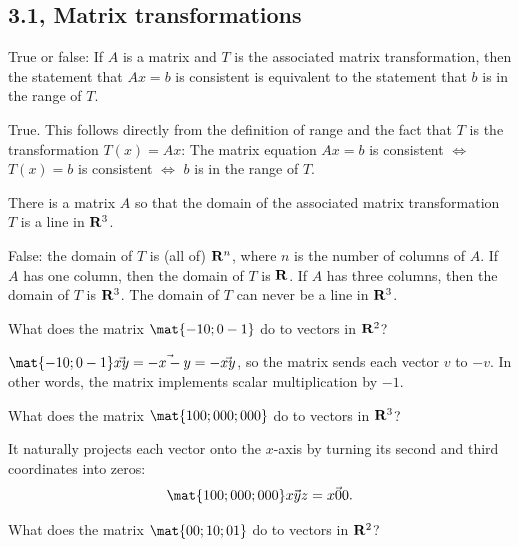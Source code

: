 
\subsection{3.1, Matrix transformations}

\begin{problems}
%
\problem %
True or false: If $A$ is a matrix and $T$ is the associated matrix 
transformation, then the statement that $Ax = b$ is consistent is 
equivalent to the statement that $b$ is in the range of $T$.

\begin{solution}
  True. This follows directly from the definition of range and the fact that $T$
  is the transformation $T(x) = Ax$: \newline %
  The matrix equation $Ax = b$ is consistent $\iff$ $T(x) = b$ is consistent
    $\iff$ $b$ is in the range of $T$.
\end{solution}

\problem %
There is a matrix $A$ so that the domain of the associated matrix transformation
$T$ is a line in ${\bf R}^3$.

\begin{solution}
  False: the domain of $T$ is (all of) ${\bf R}^n$, where $n$ is the number of
  columns of $A$.  If $A$ has one column, then the domain of $T$ is ${\bf
    R}$. If $A$ has three columns, then the domain of $T$ is ${\bf R}^3$.  The
  domain of $T$ can never be a line in ${\bf R}^3$.
\end{solution}


\problem %
What does the matrix $\mat{-1 0; 0 -1}$ do to vectors in ${\bf R}^2$?

\begin{solution}
  $\mat{-1 0; 0 -1}\vec{x y} = \vec{-x -y} = - \vec{x y}$, so the matrix sends
  each vector $v$ to $-v$.  In other words, the matrix implements scalar
  multiplication by $-1$.
\end{solution}



\problem %
What does the matrix $\mat{1 0 0; 0 0 0; 0 0 0}$ do to vectors in ${\bf R}^3$?

\begin{solution}
It naturally projects each vector onto the $x$-axis by turning its second and third coordinates into zeros:
\[\mat{1 0 0; 0 0 0; 0 0 0} \vec{x y z} = \vec{x 0 0}.\]
\end{solution}

\problem %
What does the matrix $\mat{0 0; 1 0; 0 1}$ do to vectors in ${\bf R}^2$?


\end{problems}
